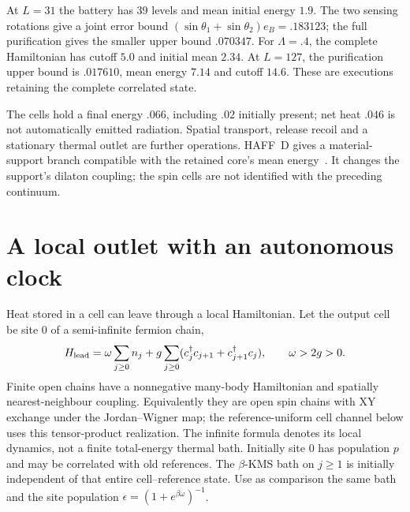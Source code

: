 At $L=31$ the battery has 39 levels and mean initial energy $1.9$.
The two sensing rotations give a joint error bound
$(\sin\theta_1+\sin\theta_2)e_B=.183123$; the full purification gives
the smaller upper bound $.070347$. For $\Lambda=.4$, the complete
Hamiltonian has cutoff $5.0$ and initial mean $2.34$. At $L=127$,
the purification upper bound is $.017610$, mean energy $7.14$ and
cutoff $14.6$. These are executions retaining the complete correlated state.

The cells hold a final energy $.066$, including $.02$ initially present;
net heat $.046$ is not automatically emitted radiation. Spatial transport,
release recoil and a stationary thermal outlet are further operations.
HAFF~D gives a material-support branch compatible with the retained core's
mean energy~\cite{Liu2026HAFFD}. It changes the support's dilaton coupling;
the spin cells are not identified with the preceding continuum.

\section{A local outlet with an autonomous clock}
\label{sec:local-outlet}

Heat stored in a cell can leave through a local Hamiltonian. Let the
output cell be site 0 of a semi-infinite fermion chain,
\begin{equation}\label{eq:local-outlet}
 H_{\rm lead}=\omega\sum_{j\ge0}n_j
       +g\sum_{j\ge0}(c_j^\dagger c_{j+1}+c_{j+1}^\dagger c_j),
 \qquad \omega>2g>0.
\end{equation}
Finite open chains have a nonnegative many-body Hamiltonian and spatially
nearest-neighbour coupling. Equivalently they are open spin chains with
XY exchange under the Jordan--Wigner map; the reference-uniform cell
channel below uses this tensor-product realization. The infinite formula denotes its local
dynamics, not a finite total-energy thermal bath. Initially site 0 has
population $p$ and may be correlated with old references. The
$\beta$-KMS bath on $j\ge1$ is initially independent of that entire
cell--reference state. Use as comparison the same bath and the
site population $\epsilon=(1+e^{\beta\omega})^{-1}$.

